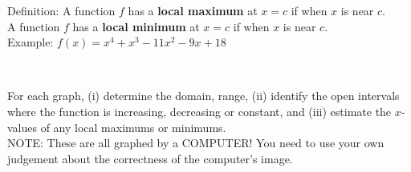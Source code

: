 \documentclass[11pt]{article}
\begin{document}
Definition: A function $f$ has a {\bf{local maximum}} at $x=c$ if \fbox{ \begin{minipage}{2in} \hfill\vspace{0.3in} \end{minipage} } when $x$ is near $c.$\\
A function $f$ has a {\bf{local minimum}} at $x=c$ if \fbox{ \begin{minipage}{2in} \hfill\vspace{0.3in} \end{minipage} } when $x$ is near $c.$\\

Example: $f(x)=x^4+x^3-11x^2-9x+18$ \\
\\
 \newpage
 

{} For each graph, (i) determine the domain, range, (ii) identify the open intervals where the function is increasing, decreasing or constant, and (iii) estimate the $x$-values of any local maximums or minimums.\\
NOTE: These are all graphed by a COMPUTER! You need to use your own judgement about the correctness of the computer's image.\\
\end{document}
